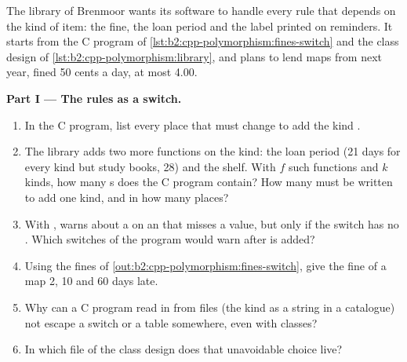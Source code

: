 \begin{problem}\label{pb:b2:cpp-polymorphism:1}
The library of Brenmoor wants its software to handle every rule that depends on the kind of item: the fine, the loan
period and the label printed on reminders. It starts from the C program of \cref{lst:b2:cpp-polymorphism:fines-switch}
and the class design of \cref{lst:b2:cpp-polymorphism:library}, and plans to lend maps from next year, fined 50 cents
a day, at most 4.00.

\medskip\noindent\textbf{Part I --- The rules as a switch.}\par\nopagebreak
\begin{enumerate}[beginpenalty=10000]
\item In the C program, list every place that must change to add the kind .
\item The library adds two more functions on the kind: the loan period (21 days for every kind but study books, 28)
and the shelf. With $f$ such functions and $k$ kinds, how many s does the C program contain? How many must
be written to add one kind, and in how many places?
\item With ,  warns about a  on an  that misses a value, but only if
the switch has no . Which switches of the program would warn after  is added?
\item Using the fines of \cref{out:b2:cpp-polymorphism:fines-switch}, give the fine of a map 2, 10 and 60 days late.
\item Why can a C program read in from files (the kind as a string in a catalogue) not escape a switch or a table
somewhere, even with classes?
\item In which file of the class design does that unavoidable choice live?
\end{enumerate}


\end{problem}
